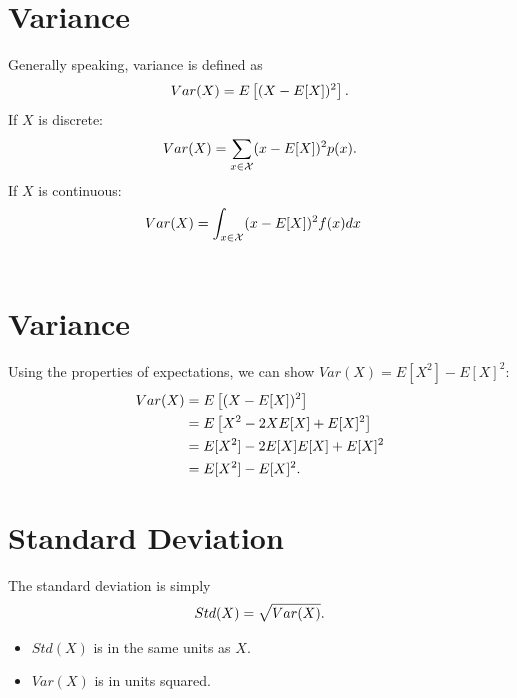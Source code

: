 \documentclass[letterpaper,10pt,english]{sphinxmanual}
\begin{document}
\section{Variance}
\label{probability:variance}
Generally speaking, variance is defined as
\begin{gather}
\begin{split}Var(X) = E\left[(X - E[X])^2\right].\end{split}\notag
\end{gather}
If $X$ is discrete:
\begin{gather}
\begin{split}Var(X) = \sum_{x\in \mathcal{X}} (x - E[X])^2 p(x).\end{split}\notag
\end{gather}
If $X$ is continuous:
\begin{gather}
\begin{split}Var(X) & = \int_{x\in \mathcal{X}} (x - E[X])^2 f(x) dx\end{split}\notag\\\begin{split}\end{split}\notag
\end{gather}

\section{Variance}
\label{probability:id2}
Using the properties of expectations, we can show $Var(X) =
E[X^2] - E[X]^2$:
\begin{gather}
\begin{split}Var(X) & = E\left[(X - E[X])^2\right] \\
& = E\left[X^2 - 2XE[X] + E[X]^2\right] \\
& = E[X^2] - 2E[X]E[X] + E[X]^2 \\
& = E[X^2] - E[X]^2.\end{split}\notag
\end{gather}

\section{Standard Deviation}
\label{probability:standard-deviation}
The standard deviation is simply
\begin{gather}
\begin{split}Std(X) = \sqrt{Var(X)}.\end{split}\notag
\end{gather}\begin{itemize}
\item {} 
$Std(X)$ is in the same units as $X$.

\end{itemize}
\begin{itemize}
\item {} 
$Var(X)$ is in units squared.

\end{itemize}
\end{document}
